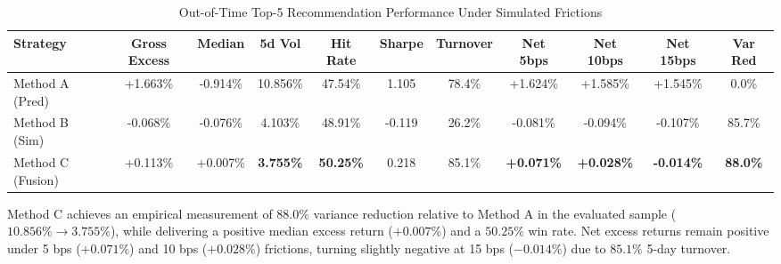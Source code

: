 \documentclass[11pt,a4paper]{article}
\begin{document}
\begin{table}[H]
\centering
\small
\caption{Out-of-Time Top-5 Recommendation Performance Under Simulated Frictions}
\label{tab:recommendations}
\begin{tabular}{lcccccccccc}
\toprule
\textbf{Strategy} & \textbf{Gross Excess} & \textbf{Median} & \textbf{5d Vol} & \textbf{Hit Rate} & \textbf{Sharpe} & \textbf{Turnover} & \textbf{Net 5bps} & \textbf{Net 10bps} & \textbf{Net 15bps} & \textbf{Var Red} \\
\midrule
Method A (Pred) & +1.663\% & -0.914\% & 10.856\% & 47.54\% & 1.105 & 78.4\% & +1.624\% & +1.585\% & +1.545\% & 0.0\% \\
Method B (Sim) & -0.068\% & -0.076\% & 4.103\% & 48.91\% & -0.119 & 26.2\% & -0.081\% & -0.094\% & -0.107\% & 85.7\% \\
Method C (Fusion) & +0.113\% & +0.007\% & \textbf{3.755\%} & \textbf{50.25\%} & 0.218 & 85.1\% & \textbf{+0.071\%} & \textbf{+0.028\%} & \textbf{-0.014\%} & \textbf{88.0\%} \\
\bottomrule
\end{tabular}
\end{table}

Method C achieves an empirical measurement of $88.0\%$ variance reduction relative to Method A in the evaluated sample ($10.856\% \to 3.755\%$), while delivering a positive median excess return ($+0.007\%$) and a $50.25\%$ win rate. Net excess returns remain positive under 5 bps ($+0.071\%$) and 10 bps ($+0.028\%$) frictions, turning slightly negative at 15 bps ($-0.014\%$) due to $85.1\%$ 5-day turnover.
\end{document}
